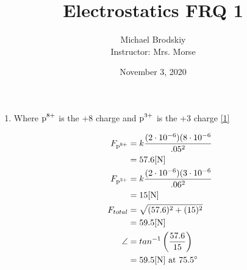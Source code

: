 \documentclass[12pt]{article}
\title{Electrostatics FRQ 1}
\date{November 3, 2020}
\author{Michael Brodskiy\\ \small Instructor: Mrs. Morse}
\begin{document}
\maketitle

\begin{enumerate}

  \item Where $\ce{p^8+}$ is the +8 charge and $\ce{p^3+}$ is the +3 charge \eqref{1}

    \begin{equation}
      \begin{split}
        F_{\ce{p^8+}}&=k\frac{(2\cdot10^{-6})(8\cdot10^{-6}}{.05^2}\\
          &=57.6[\si{\newton}]\\
        F_{\ce{p^3+}}&=k\frac{(2\cdot10^{-6})(3\cdot10^{-6}}{.06^2}\\
          &=15[\si{\newton}]\\
          F_{total}&=\sqrt{(57.6)^2+(15)^2}\\
          &=59.5[\si{\newton}]\\
          \angle&=tan^{-1}\left( \frac{57.6}{15} \right)\\
          &=59.5[\si{\newton}]\text{ at } 75.5^{\circ}\\
    \end{split}
      \label{1}
    \end{equation}

\end{enumerate}
\end{document}
